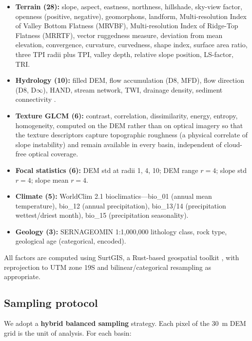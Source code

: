 \begin{itemize}
    \item \textbf{Terrain (28):} slope, aspect, eastness, northness, hillshade, sky-view factor, openness (positive, negative), geomorphons, landform, Multi-resolution Index of Valley Bottom Flatness (MRVBF), Multi-resolution Index of Ridge-Top Flatness (MRRTF), vector ruggedness measure, deviation from mean elevation, convergence, curvature, curvedness, shape index, surface area ratio, three TPI radii plus TPI, valley depth, relative slope position, LS-factor, TRI.
    \item \textbf{Hydrology (10):} filled DEM, flow accumulation (D8, MFD), flow direction (D8, D$\infty$), HAND, stream network, TWI, drainage density, sediment connectivity \citep{borselli2008sc}.
    \item \textbf{Texture GLCM (6):} contrast, correlation, dissimilarity, energy, entropy, homogeneity, computed on the DEM rather than on optical imagery so that the texture descriptors capture topographic roughness (a physical correlate of slope instability) and remain available in every basin, independent of cloud-free optical coverage.
    \item \textbf{Focal statistics (6):} DEM std at radii 1, 4, 10; DEM range $r=4$; slope std $r=4$; slope mean $r=4$.
    \item \textbf{Climate (5):} WorldClim 2.1 bioclimatics---bio\_01 (annual mean temperature), bio\_12 (annual precipitation), bio\_13/14 (precipitation wettest/driest month), bio\_15 (precipitation seasonality).
    \item \textbf{Geology (3):} SERNAGEOMIN 1:1{,}000{,}000 lithology class, rock type, geological age (categorical, encoded).
\end{itemize}

All factors are computed using SurtGIS, a Rust-based geospatial toolkit \citep{parra2026surtgis}, with reprojection to UTM zone 19S and bilinear/categorical resampling as appropriate.

\subsection{Sampling protocol}
\label{sec:data:sampling}

We adopt a \textbf{hybrid balanced sampling} strategy. Each pixel of the 30~m DEM grid is the unit of analysis. For each basin:

